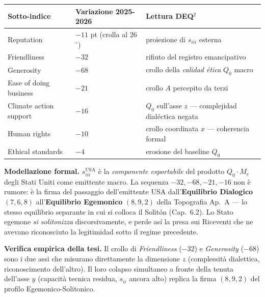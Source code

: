 {\def\LTcaptype{none} %
{\small\begin{longtable}[]{@{}
  >{\raggedright\arraybackslash}p{}
  >{\raggedright\arraybackslash}p{}
  >{\raggedright\arraybackslash}p{}@{}}
\toprule\noalign{}
\begin{minipage}[b]{\linewidth}\raggedright
Sotto-indice
\end{minipage} & \begin{minipage}[b]{\linewidth}\raggedright
Variazione 2025-2026
\end{minipage} & \begin{minipage}[b]{\linewidth}\raggedright
Lettura DEQ$^2$
\end{minipage} \\
\midrule\noalign{}
\endhead
\bottomrule\noalign{}
\endlastfoot
Reputation & \(-11\) pt (crolla al 26$^\circ$) & proiezione di \(s_{iii}\)
esterna \\
Friendliness & \(-32\) & rifiuto del registro emancipativo \\
Generosity & \(-68\) & crollo della \emph{calidad ética} \(Q_0\)
macro \\
Ease of doing business & \(-21\) & crollo \(A\) percepito da terzi \\
Climate action support & \(-16\) & \(Q_0\) sull'asse \(z\) ---
complejidad dialéctica negata \\
Human rights & \(-10\) & crollo coordinata \(x\) --- coherencia formal \\
Ethical standards & \(-4\) & erosione del baseline \(Q_0\) \\
\end{longtable}}
}

\Hypoth{} \textbf{Modellazione formal.} \(s_{iii}^{\text{USA}}\) è la
\emph{componente esportabile} del prodotto \(Q_0 \cdot M_e\) degli Stati
Uniti come emittente macro. La sequenza \(-32, -68, -21, -16\) non è
rumore: è la firma del passaggio dell'emittente USA
dall'\textbf{Equilibrio Dialogico} \((7, 6, 8)\) all'\textbf{Equilibrio
Egemonico} \((8, 9, 2)\) della Topografia Ap.~A --- lo stesso
equilibrio separante in cui si colloca il Solitón (Cap.~6.2). Lo Stato
egemone \emph{si solitonizza} discorsivamente, e perde así la presa sui
Riceventi che ne avevano riconosciuto la legitimidad sotto il regime
precedente.

\Proved{} \textbf{Verifica empirica della tesi.} Il crollo di
\emph{Friendliness} (\(-32\)) e \emph{Generosity} (\(-68\)) sono i due
assi che misurano direttamente la dimensione \(z\) (complessità
dialettica, riconoscimento dell'altro). Il loro colapso simultaneo a
fronte della tenuta dell'asse \(y\) (capacità tecnica residua,
\(s_{ii}\) ancora alto) replica la firma \((8, 9, 2)\) del profilo
Egemonico-Solitonico.



